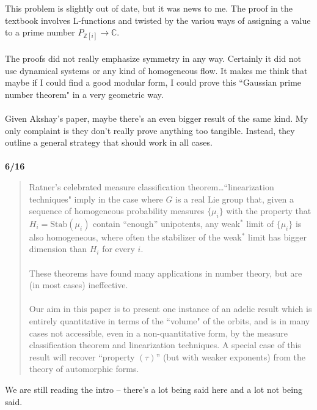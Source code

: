 \documentclass[12pt]{article}
\begin{document}
\noindent This problem is slightly out of date, but it was news to me.  The proof in the textbook involves L-functions and twisted by the variou ways of assigning a value to a prime number $P_{\mathbb{Z}[i]} \to \mathbb{C}$.  \\ \\ 
The proofs did not really emphasize symmetry in any way. Certainly it did not use dynamical systems or any kind of homogeneous flow.  It makes me think that maybe if I could find a good modular form, I could prove this ``Gaussian prime number theorem" in a very geometric way. \\ \\
Given Akshay's paper, maybe there's an even bigger result of the same kind.   My only complaint is they don't really prove anything too tangible.  Instead, they outline a general strategy that should work in all cases.  \\ \\
\textbf{6/16} 
\begin{quotation}

Ratner's celebrated measure classification theorem\dots ``linearization techniques"
imply in the case where $G$
is a real Lie group that, given a sequence of homogeneous probability measures
$\{\mu_i\}$ with the property that $H_i=\mathrm{Stab}(\mu_i)$ contain ``enough'' unipotents,
any weak$^*$ limit of $\{\mu_i\}$ is also homogeneous, where often
the stabilizer of the weak$^*$ limit has bigger dimension than $H_i$ for 
every $i$. \\ \\
These theorems have found many applications in number theory, but are (in most cases) ineffective. \\ \\
Our aim in this paper is  to present one instance
of an adelic result which is entirely quantitative in terms of the ``volume" of the orbits, 
and is in many cases not accessible, even in a non-quantitative form, by the measure classification theorem and linearization techniques.
A special case of this result
will recover ``property $(\tau)$'' (but with weaker exponents) from the theory of automorphic forms.
\end{quotation}
We are still reading the intro -- there's a lot being said here and a lot not being said.
\end{document}
